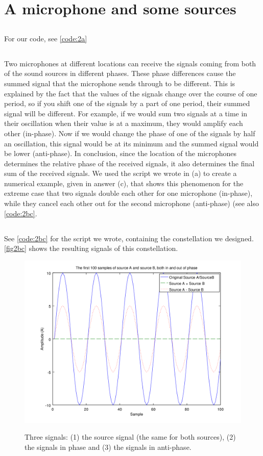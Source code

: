\documentclass{article}
\begin{document}
\newpage

\section{A microphone and some sources}
\subsection{}
For our code, see \autoref{code:2a}

\subsection{}
Two microphones at different locations can receive the signals coming from both of the sound sources in different phases. These phase differences cause the summed signal that the 
microphone sends through to be different. This is explained by the fact that the values of the signals change over the course of one period, so if you shift one of the signals by a part of 
one period, their summed signal will be different. For example,
if we would sum two signals at a time in their oscillation when their value is at a maximum, they would amplify each other (in-phase). Now if we would change the phase of one of the signals 
by half an oscillation, this signal would be at its minimum and the summed signal would be lower (anti-phase). In conclusion, since the location of the microphones determines the relative phase of the received signals,
it also determines the final sum of the received signals.
We used the script we wrote in (a) to create a numerical example, given in answer (c), that shows this phenomenon for the extreme case that two signals double each other for one microphone (in-phase),
while they cancel each other out for the second microphone (anti-phase) (see also \autoref{code:2bc}.

\subsection{}
See \autoref{code:2bc} for the script we wrote, containing the constellation we designed. \autoref{fig2bc} shows the resulting signals of this constellation.

\begin{figure}[H]
  \centering
  \includegraphics[width=0.7\columnwidth]{plot2B.png}\\
  \caption{Three signals: (1) the source signal (the same for both sources), (2) the signals in phase and (3) the signals in anti-phase.}
  \label{fig2bc}
\end{figure}
\end{document}
